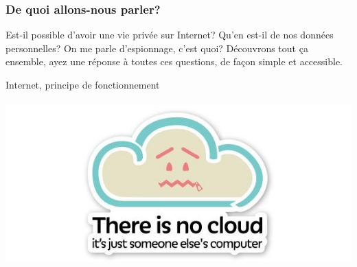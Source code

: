 \documentclass{beamer}
\begin{document}
\begin{frame}
\frametitle{De quoi allons-nous parler?}
Est-il possible d'avoir une vie privée sur Internet?
Qu'en est-il de nos données personnelles? On me parle d'espionnage, c'est quoi? 
Découvrons tout ça ensemble, ayez une réponse à toutes ces questions, de façon simple et accessible.
\end{frame}

\begin{frame}
\begin{center}
\Huge{Internet, principe de fonctionnement}
\\~\\ \includegraphics[scale=0.4]{./images/cloud.png}
\end{center}
\end{frame}
\end{document}
